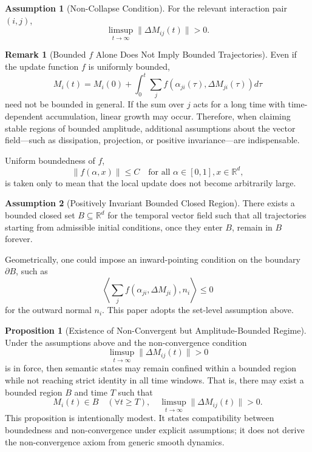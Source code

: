 \documentclass[11pt,a4paper]{article}
\theoremstyle{definition}
\newtheorem{proposition}{Proposition}[section]
\newtheorem{assumption}{Assumption}[section]
\newtheorem{remark}{Remark}[section]
\begin{document}
\begin{assumption}[Non-Collapse Condition]
For the relevant interaction pair $(i,j)$,
\[
\limsup_{t\to\infty}\|\Delta M_{ij}(t)\|>0.
\]
\end{assumption}

\begin{remark}[Bounded $f$ Alone Does Not Imply Bounded Trajectories]
Even if the update function $f$ is uniformly bounded,
\[
M_i(t) = M_i(0) + \int_0^t \sum_j f(\alpha_{ji}(\tau), \Delta M_{ji}(\tau)) d\tau
\]
need not be bounded in general. If the sum over $j$ acts for a long time with time-dependent accumulation, linear growth may occur. Therefore, when claiming stable regions of bounded amplitude, additional assumptions about the vector field---such as dissipation, projection, or positive invariance---are indispensable.

Uniform boundedness of $f$,
\[
\|f(\alpha, x)\| \leq C \quad \text{for all } \alpha \in [0,1], x \in \mathbb{R}^d,
\]
is taken only to mean that the local update does not become arbitrarily large.
\end{remark}

\begin{assumption}[Positively Invariant Bounded Closed Region]
There exists a bounded closed set $B \subseteq \mathbb{R}^d$ for the temporal vector field such that all trajectories starting from admissible initial conditions, once they enter $B$, remain in $B$ forever.

Geometrically, one could impose an inward-pointing condition on the boundary $\partial B$, such as
\[
\left\langle \sum_j f(\alpha_{ji}, \Delta M_{ji}), n_i \right\rangle \leq 0
\]
for the outward normal $n_i$. This paper adopts the set-level assumption above.
\end{assumption}


\begin{proposition}[Existence of Non-Convergent but Amplitude-Bounded Regime]
Under the assumptions above and the non-convergence condition
\[
\limsup_{t \to \infty} \|\Delta M_{ij}(t)\| > 0
\]
is in force, then semantic states may remain confined within a bounded region while not reaching strict identity in all time windows. That is, there may exist a bounded region $B$ and time $T$ such that
\[
M_i(t) \in B \quad (\forall t \geq T), \quad \limsup_{t \to \infty} \|\Delta M_{ij}(t)\| > 0.
\]
This proposition is intentionally modest. It states compatibility between boundedness and non-convergence under explicit assumptions; it does not derive the non-convergence axiom from generic smooth dynamics.
\end{proposition}
\end{document}
